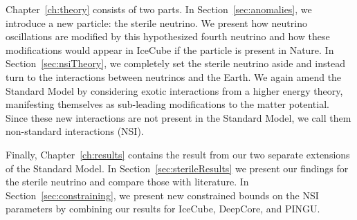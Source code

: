 Chapter~\ref{ch:theory} consists of two parts. In Section~\ref{sec:anomalies}, we introduce a new particle: the sterile neutrino. 
We present how neutrino oscillations are modified by this hypothesized fourth neutrino and how these modifications would appear in IceCube if the particle is present in Nature. 
In Section~\ref{sec:nsiTheory}, we completely set the sterile neutrino aside and instead turn to the interactions between neutrinos and the Earth. 
We again amend the Standard Model by considering exotic interactions from a higher energy theory, manifesting themselves as sub-leading modifications to the matter potential. 
Since these new interactions are not present in the Standard Model, we call them non-standard interactions (NSI). 

Finally, Chapter~\ref{ch:results} contains the result from our two separate extensions of the Standard Model.
In Section~\ref{sec:sterileResults} we present our findings for the sterile neutrino and compare those with literature. 
In Section~\ref{sec:constraining}, we present new constrained bounds on the NSI parameters by combining our results for IceCube, DeepCore, and PINGU.